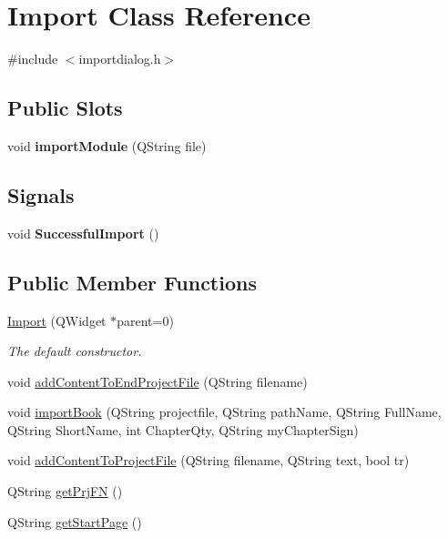 \hypertarget{classImport}{
\section{Import Class Reference}
\label{classImport}
}


{\ttfamily \#include $<$importdialog.h$>$}

\subsection*{Public Slots}
\begin{DoxyCompactItemize}
\item 
\hypertarget{classImport_aa42f17e85fea0e76e1285c8fdf34054b}{
void {\bfseries importModule} (QString file)}
\label{classImport_aa42f17e85fea0e76e1285c8fdf34054b}

\end{DoxyCompactItemize}
\subsection*{Signals}
\begin{DoxyCompactItemize}
\item 
\hypertarget{classImport_a9e3e5edfb44bfac7f5a1c47aada4e4d7}{
void {\bfseries SuccessfulImport} ()}
\label{classImport_a9e3e5edfb44bfac7f5a1c47aada4e4d7}

\end{DoxyCompactItemize}
\subsection*{Public Member Functions}
\begin{DoxyCompactItemize}
\item 
\hyperlink{classImport_a6eba0bb8ae41a701f0ea7dfdbd99856c}{Import} (QWidget $\ast$parent=0)
\begin{DoxyCompactList}\small\item\em The default constructor. \item\end{DoxyCompactList}\item 
void \hyperlink{classImport_ac00f1a1f7b4784c2efd657cdc8b502c5}{addContentToEndProjectFile} (QString filename)
\item 
void \hyperlink{classImport_a546cc6c3932b1028aa139376beab85b3}{importBook} (QString projectfile, QString pathName, QString FullName, QString ShortName, int ChapterQty, QString myChapterSign)
\item 
void \hyperlink{classImport_a55dc3d2624e169ce1462fab63450e12e}{addContentToProjectFile} (QString filename, QString text, bool tr)
\item 
QString \hyperlink{classImport_ac04b9632c6b9560cc7704b5ae024e309}{getPrjFN} ()
\item 
QString \hyperlink{classImport_a1329a8a68f94129f5d6b1f20eeabbcd2}{getStartPage} ()
\end{DoxyCompactItemize}


